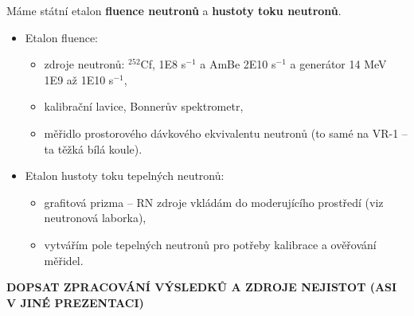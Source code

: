 Máme státní etalon \textbf{fluence neutronů} a \textbf{hustoty toku neutronů}.

\begin{itemize}
    \item Etalon fluence:
    \begin{itemize}
        \item zdroje neutronů: $^{252}$Cf, 1E8 s$^{-1}$ a AmBe 2E10 s$^{-1}$ a generátor 14 MeV 1E9 až 1E10 s$^{-1}$,
        \item kalibrační lavice, Bonnerův spektrometr,
        \item měřidlo prostorového dávkového ekvivalentu neutronů (to samé na VR-1 -- ta těžká bílá koule).
    \end{itemize}

    \item Etalon hustoty toku tepelných neutronů:
    \begin{itemize}
        \item grafitová prizma -- RN zdroje vkládám do moderujícího prostředí (viz neutronová laborka),
        \item vytvářím pole tepelných neutronů pro potřeby kalibrace a ověřování měřidel.
    \end{itemize}
\end{itemize}

\textbf{DOPSAT ZPRACOVÁNÍ VÝSLEDKŮ A ZDROJE NEJISTOT (ASI V JINÉ PREZENTACI)}